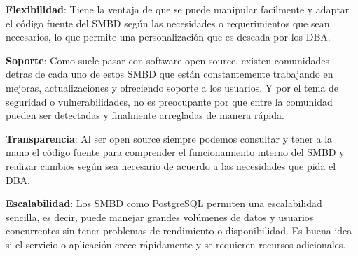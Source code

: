 \documentclass[12pt]{report}
\begin{document}
\begin{enumerate}[label=\roman*.]
\begin{enumerate}[label=\textbf{\arabic*.}, itemsep=2.0em]
\textbf{Flexibilidad}: Tiene la ventaja de que se puede manipular facilmente y adaptar el código fuente del SMBD según las necesidades o requerimientos que sean necesarios, lo que permite una personalización que es deseada por los DBA.

\textbf{Soporte}: Como suele pasar con software open source, existen comunidades detras de cada uno de estos SMBD que están constantemente trabajando en mejoras, actualizaciones y ofreciendo soporte a los usuarios. Y por el tema de seguridad o vulnerabilidades, no es preocupante por que entre la comunidad pueden ser detectadas y finalmente arregladas de manera rápida.

\textbf{Transparencia}: Al ser open source siempre podemos consultar y tener a la mano el código fuente para comprender el funcionamiento interno del SMBD y realizar cambios según sea necesario de acuerdo a las necesidades que pida el DBA.

\textbf{Escalabilidad}: Los SMBD como PostgreSQL permiten una escalabilidad sencilla, es decir, puede manejar grandes volúmenes de datos y usuarios concurrentes sin tener problemas de rendimiento o disponibilidad. Es buena idea si el servicio o aplicación crece rápidamente y se requieren recursos adicionales.


\end{enumerate}
\end{enumerate}
\end{document}
